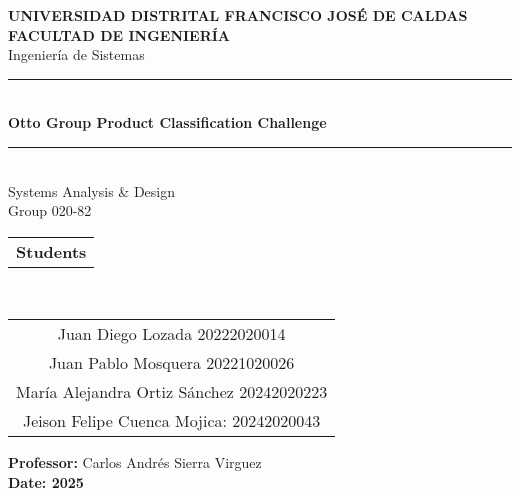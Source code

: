 \documentclass[12pt]{article}%
\begin{document}
\begin{center}

    {\Large \textbf{UNIVERSIDAD DISTRITAL FRANCISCO JOSÉ DE CALDAS}}\\[1cm]%
    {\large \textbf{FACULTAD DE INGENIERÍA}}\\%
    {\large Ingeniería de Sistemas}\\[2cm]

    \rule{\textwidth}{0.4pt}\\[0.8cm]
    {\Large \textbf{Otto Group Product Classification Challenge}}\\[0.8cm]

    \rule{\textwidth}{0.4pt}\\[2cm]

    {\Large Systems Analysis \& Design}\\[1cm]
    {\large Group 020-82}\\[2.5cm]

    \begin{tabular}{>{\bfseries}c}%
        Students \\

    \end{tabular}\\[1cm]

    \begin{tabular}{c}
        Juan Diego Lozada 20222020014\\
        Juan Pablo Mosquera 20221020026 \\
        María Alejandra Ortiz Sánchez 20242020223 \\
        Jeison Felipe Cuenca Mojica: 20242020043 \\
    \end{tabular}
    \vfill %

    \textbf{Professor:} Carlos Andrés Sierra Virguez \\[1cm]
    \textbf{Date: 2025} 
    
\end{center}
\end{document}
